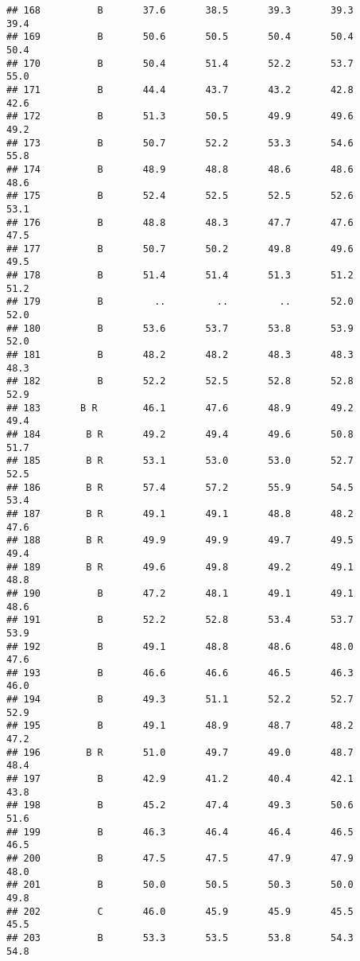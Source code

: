 \documentclass[]{article}
\begin{document}
\begin{verbatim}
## 168          B       37.6       38.5       39.3       39.3       39.4
## 169          B       50.6       50.5       50.4       50.4       50.4
## 170          B       50.4       51.4       52.2       53.7       55.0
## 171          B       44.4       43.7       43.2       42.8       42.6
## 172          B       51.3       50.5       49.9       49.6       49.2
## 173          B       50.7       52.2       53.3       54.6       55.8
## 174          B       48.9       48.8       48.6       48.6       48.6
## 175          B       52.4       52.5       52.5       52.6       53.1
## 176          B       48.8       48.3       47.7       47.6       47.5
## 177          B       50.7       50.2       49.8       49.6       49.5
## 178          B       51.4       51.4       51.3       51.2       51.2
## 179          B         ..         ..         ..       52.0       52.0
## 180          B       53.6       53.7       53.8       53.9       52.0
## 181          B       48.2       48.2       48.3       48.3       48.3
## 182          B       52.2       52.5       52.8       52.8       52.9
## 183       B R        46.1       47.6       48.9       49.2       49.4
## 184        B R       49.2       49.4       49.6       50.8       51.7
## 185        B R       53.1       53.0       53.0       52.7       52.5
## 186        B R       57.4       57.2       55.9       54.5       53.4
## 187        B R       49.1       49.1       48.8       48.2       47.6
## 188        B R       49.9       49.9       49.7       49.5       49.4
## 189        B R       49.6       49.8       49.2       49.1       48.8
## 190          B       47.2       48.1       49.1       49.1       48.6
## 191          B       52.2       52.8       53.4       53.7       53.9
## 192          B       49.1       48.8       48.6       48.0       47.6
## 193          B       46.6       46.6       46.5       46.3       46.0
## 194          B       49.3       51.1       52.2       52.7       52.9
## 195          B       49.1       48.9       48.7       48.2       47.2
## 196        B R       51.0       49.7       49.0       48.7       48.4
## 197          B       42.9       41.2       40.4       42.1       43.8
## 198          B       45.2       47.4       49.3       50.6       51.6
## 199          B       46.3       46.4       46.4       46.5       46.5
## 200          B       47.5       47.5       47.9       47.9       48.0
## 201          B       50.0       50.5       50.3       50.0       49.8
## 202          C       46.0       45.9       45.9       45.5       45.5
## 203          B       53.3       53.5       53.8       54.3       54.8

\end{verbatim}
\end{document}
